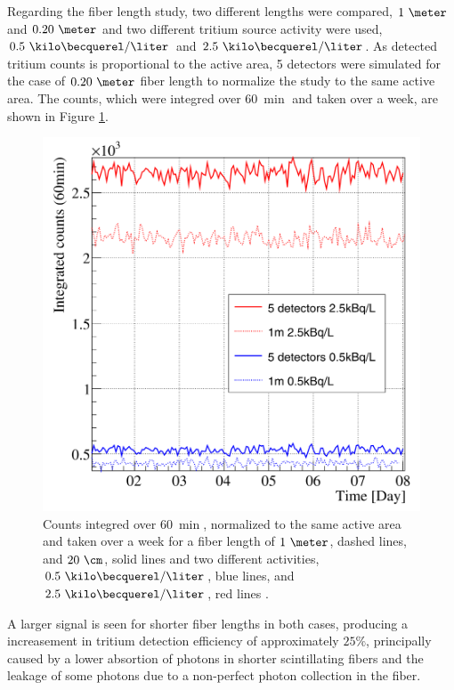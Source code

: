 Regarding the fiber length study, two different lengths were compared, $1~\meter$ and $0.20~\meter$ and two different tritium source activity were used, $0.5~\kilo\becquerel/\liter$ and $2.5~\kilo\becquerel/\liter$. As detected tritium counts is proportional to the active area, 5 detectors were simulated for the case of $0.20~\meter$ fiber length to normalize the study to the same active area. The counts, which were integred over $60~\min$ and taken over a week, are shown in Figure \ref{fig:CountsOver60minDifferentLength}.

\begin{figure}[h]
\centering
\includegraphics[scale=0.3]{Figures/8SimulationsResults/81TRITIUMDesign/813Length/2DifferentLength.png}
\caption{Counts integred over $60~\min$, normalized to the same active area and taken over a week for a fiber length of $1~\meter$, dashed lines, and $20~\cm$, solid lines and two different activities, $0.5~\kilo\becquerel/\liter$, blue lines, and $2.5~\kilo\becquerel/\liter$, red lines \cite{SimulationPaperCarlos}. \label{fig:CountsOver60minDifferentLength}}
\end{figure}

A larger signal is seen for shorter fiber lengths in both cases, producing a increasement in tritium detection efficiency of approximately $25\%$, principally caused by a lower absortion of photons in shorter scintillating fibers and the leakage of some photons due to a non-perfect photon collection in the fiber.